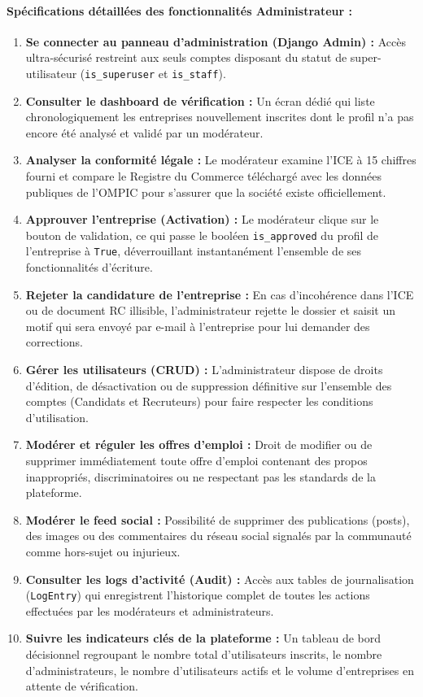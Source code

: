 \paragraph{Spécifications détaillées des fonctionnalités Administrateur :}
\begin{enumerate}
    \item \textbf{Se connecter au panneau d'administration (Django Admin) :} Accès ultra-sécurisé restreint aux seuls comptes disposant du statut de super-utilisateur (\texttt{is\_superuser} et \texttt{is\_staff}).
    \item \textbf{Consulter le dashboard de vérification :} Un écran dédié qui liste chronologiquement les entreprises nouvellement inscrites dont le profil n'a pas encore été analysé et validé par un modérateur.
    \item \textbf{Analyser la conformité légale :} Le modérateur examine l'ICE à 15 chiffres fourni et compare le Registre du Commerce téléchargé avec les données publiques de l'OMPIC pour s'assurer que la société existe officiellement.
    \item \textbf{Approuver l'entreprise (Activation) :} Le modérateur clique sur le bouton de validation, ce qui passe le booléen \texttt{is\_approved} du profil de l'entreprise à \texttt{True}, déverrouillant instantanément l'ensemble de ses fonctionnalités d'écriture.
    \item \textbf{Rejeter la candidature de l'entreprise :} En cas d'incohérence dans l'ICE ou de document RC illisible, l'administrateur rejette le dossier et saisit un motif qui sera envoyé par e-mail à l'entreprise pour lui demander des corrections.
    \item \textbf{Gérer les utilisateurs (CRUD) :} L'administrateur dispose de droits d'édition, de désactivation ou de suppression définitive sur l'ensemble des comptes (Candidats et Recruteurs) pour faire respecter les conditions d'utilisation.
    \item \textbf{Modérer et réguler les offres d'emploi :} Droit de modifier ou de supprimer immédiatement toute offre d'emploi contenant des propos inappropriés, discriminatoires ou ne respectant pas les standards de la plateforme.
    \item \textbf{Modérer le feed social : } Possibilité de supprimer des publications (posts), des images ou des commentaires du réseau social signalés par la communauté comme hors-sujet ou injurieux.
    \item \textbf{Consulter les logs d'activité (Audit) :} Accès aux tables de journalisation (\texttt{LogEntry}) qui enregistrent l'historique complet de toutes les actions effectuées par les modérateurs et administrateurs.
    \item \textbf{Suivre les indicateurs clés de la plateforme :} Un tableau de bord décisionnel regroupant le nombre total d'utilisateurs inscrits, le nombre d'administrateurs, le nombre d'utilisateurs actifs et le volume d'entreprises en attente de vérification.
\end{enumerate}

